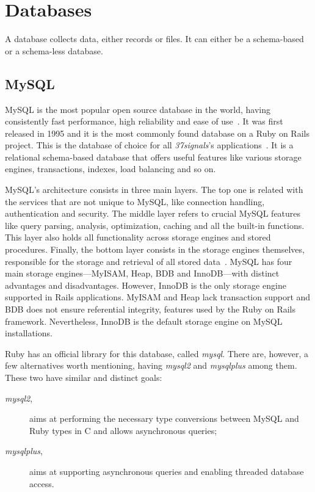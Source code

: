 \section{Databases} %
\label{tech:sec:databases}
A database collects data, either records or files. It can either be a schema-based or a schema-less database.

\subsection{MySQL}
MySQL is the most popular open source database in the world, having consistently fast performance, high reliability and ease of use~\cite{why_mysql}. It was first released in 1995 and it is the most commonly found database on a Ruby on Rails project. This is the database of choice for all \textit{37signals}'s applications~\cite{interview_dhh}.  It is a relational schema-based database that offers useful features like various storage engines, transactions, indexes, load balancing and so on.

MySQL's architecture consists in three main layers. The top one is related with the services that are not unique to MySQL, like connection handling, authentication and security. The middle layer refers to crucial MySQL features like query parsing, analysis, optimization, caching and all the built-in functions.  This layer also holds all functionality across storage engines and stored procedures. Finally, the bottom layer consists in the storage engines themselves, responsible for the storage and retrieval of all stored data~\cite{high_performance_mysql}. MySQL has four main storage engines---MyISAM, Heap, BDB and InnoDB---with distinct advantages and disadvantages. However, InnoDB is the only storage engine supported in Rails applications. MyISAM and Heap lack transaction support and BDB does not ensure referential integrity, features used by the Ruby on Rails framework. Nevertheless, InnoDB is the default storage engine on MySQL installations.

Ruby has an official library for this database, called \textit{mysql}. There are, however, a few alternatives worth mentioning, having \textit{mysql2} and \textit{mysqlplus} among them. These two have similar and distinct goals:
\begin{description}
  \item[\textit{mysql2},] aims at performing the necessary type conversions between MySQL and Ruby types in C and allows asynchronous queries;
  \item[\textit{mysqlplus},] aims at supporting asynchronous queries and enabling threaded database access.
\end{description}

